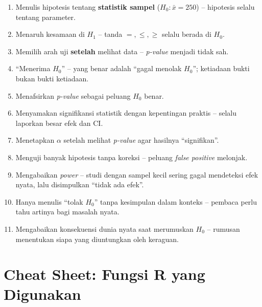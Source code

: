 \documentclass[
  indonesian,
  letterpaper,
]{book}
\providecommand{\tightlist}{%
  \setlength{\itemsep}{0pt}\setlength{\parskip}{0pt}}
\begin{document}
\begin{enumerate}
\def\labelenumi{\arabic{enumi}.}
\tightlist
\item
  Menulis hipotesis tentang \textbf{statistik sampel}
  (\(H_0: \bar{x} = 250\)) -- hipotesis selalu tentang parameter.
\item
  Menaruh kesamaan di \(H_1\) -- tanda \(=, \le, \ge\) selalu berada di
  \(H_0\).
\item
  Memilih arah uji \textbf{setelah} melihat data -- \emph{p-value}
  menjadi tidak sah.
\item
  ``Menerima \(H_0\)'' -- yang benar adalah ``gagal menolak \(H_0\)'';
  ketiadaan bukti bukan bukti ketiadaan.
\item
  Menafsirkan \emph{p-value} sebagai peluang \(H_0\) benar.
\item
  Menyamakan signifikansi statistik dengan kepentingan praktis -- selalu
  laporkan besar efek dan CI.
\item
  Menetapkan \(\alpha\) setelah melihat \emph{p-value} agar hasilnya
  ``signifikan''.
\item
  Menguji banyak hipotesis tanpa koreksi -- peluang \emph{false
  positive} melonjak.
\item
  Mengabaikan \emph{power} -- studi dengan sampel kecil sering gagal
  mendeteksi efek nyata, lalu disimpulkan ``tidak ada efek''.
\item
  Hanya menulis ``tolak \(H_0\)'' tanpa kesimpulan dalam konteks --
  pembaca perlu tahu artinya bagi masalah nyata.
\item
  Mengabaikan konsekuensi dunia nyata saat merumuskan \(H_0\) -- rumusan
  menentukan siapa yang diuntungkan oleh keraguan.
\end{enumerate}


\chapter{Cheat Sheet: Fungsi R yang
Digunakan}\label{cheat-sheet-fungsi-r-yang-digunakan-1}
\end{document}
